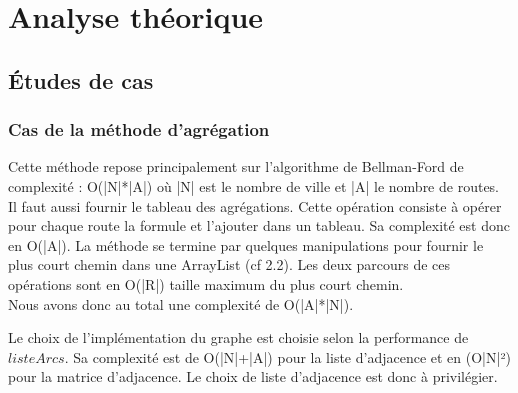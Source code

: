 \chapter{Analyse théorique}

\section{Études de cas}
\subsection{Cas de la méthode d'agrégation}

Cette méthode repose principalement sur l'algorithme de Bellman-Ford de complexité : O(|N|*|A|) où |N| est le nombre de ville et |A| le nombre de routes.
Il faut aussi fournir le tableau des agrégations. Cette opération consiste à opérer pour chaque route la formule et l'ajouter dans un tableau. Sa complexité est donc en O(|A|).
La méthode se termine par quelques manipulations pour fournir le plus court chemin dans une ArrayList (cf 2.2). Les deux parcours de ces opérations sont en O(|R|) taille maximum du plus court chemin.
\\
Nous avons donc au total une complexité de O(|A|*|N|).

Le choix de l'implémentation du graphe est choisie selon la performance de $listeArcs$. Sa complexité est de O(|N|+|A|) pour la liste d'adjacence et en (O|N|²) pour la matrice d'adjacence. Le choix de liste d'adjacence est donc à privilégier.

